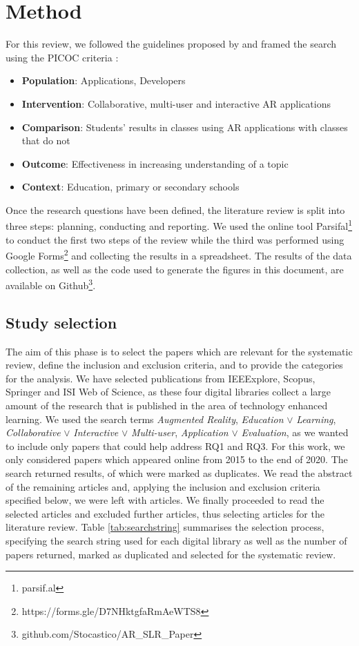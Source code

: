 
\section{Method}\label{sec:methods}
For this review, we followed the guidelines proposed by \cite{kitchenham2009systematic} and framed the search using the PICOC criteria \cite{petticrew2008systematic}:
\begin{itemize}
    \item \textbf{Population}: Applications, Developers
    \item \textbf{Intervention}: Collaborative, multi-user and interactive \gls{AR} applications
    \item \textbf{Comparison}: Students' results in classes using AR applications with classes that do not
    \item \textbf{Outcome}: Effectiveness in increasing understanding of a topic
    \item \textbf{Context}: Education, primary or secondary schools
\end{itemize}

Once the research questions have been defined, the literature review is split into three steps: planning, conducting and reporting. We used the online tool Parsifal\footnote{parsif.al} to conduct the first two steps of the review while the third was performed using Google Forms\footnote{https://forms.gle/D7NHktgfaRmAeWTS8} and collecting the results in a spreadsheet. The results of the data collection, as well as the code used to generate the figures in this document, are available on Github\footnote{github.com/Stocastico/AR\_SLR\_Paper}.


\subsection{Study selection}
The aim of this phase is to select the papers which are relevant for the systematic review, define the inclusion and exclusion criteria, and to provide the categories for the analysis.
We have selected publications from IEEExplore, Scopus, Springer and ISI Web of Science, as these four digital libraries collect a large amount of the research that is published in the area of technology enhanced learning. We used the search terms \emph{Augmented Reality}, \emph{Education} $\lor$ \emph{Learning}, \emph{Collaborative} $\lor$ \emph{Interactive} $\lor$ \emph{Multi-user}, \emph{Application} $\lor$ \emph{Evaluation}, as we wanted to include only papers that could help address RQ1 and RQ3. For this work, we only considered papers which appeared online from 2015 to the end of 2020. The search returned \allPapers results, of which \duplPapers were marked as duplicates. We read the abstract of the remaining \papersCheckAbstract articles and, applying the inclusion and exclusion criteria specified below, we were left with \papersToRead articles. We finally proceeded to read the selected articles and excluded \papersExludedAfterReading further articles, thus selecting \papersSelected articles for the literature review.
Table \ref{tab:searchstring} summarises the selection process, specifying the search string used for each digital library as well as the number of papers returned, marked as duplicated and selected for the systematic review.

